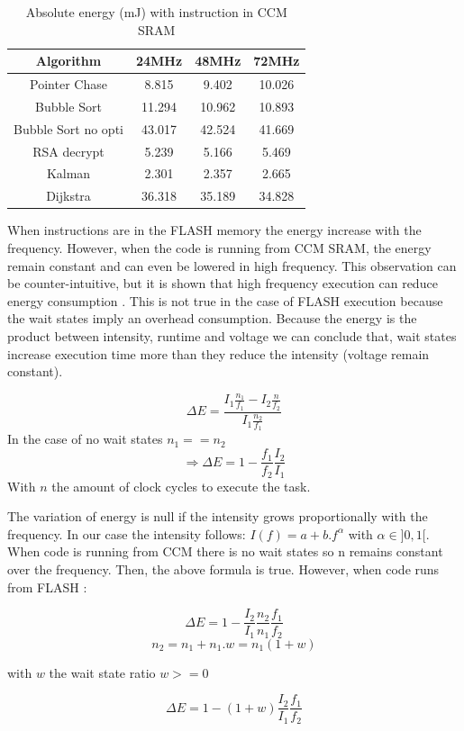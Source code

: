 \documentclass[conference]{IEEEtran}
\begin{document}
\begin{table}[h!]
\centering
\begin{tabular}{||c c c c||} 
 \hline
 Algorithm & 24MHz & 48MHz & 72MHz \\ [0.5ex] \hline\hline
 Pointer Chase & 8.815 & 9.402 & 10.026 \\ 
 Bubble Sort & 11.294 & 10.962 & 10.893 \\
 Bubble Sort no opti & 43.017 & 42.524 & 41.669 \\
 RSA decrypt & 5.239 & 5.166 & 5.469 \\
 Kalman & 2.301 & 2.357 & 2.665 \\
 Dijkstra & 36.318 & 35.189 & 34.828 \\[1ex] 
 \hline
\end{tabular}
\caption{Absolute energy (mJ) with instruction in CCM SRAM}
\label{energy_tab_code_ccm}
\end{table}

When instructions are in the FLASH memory the energy increase with the
frequency. However, when the code is running from CCM SRAM, the energy remain
constant and can even be lowered in high frequency. This observation can be
counter-intuitive, but it is shown that high frequency execution can reduce
energy consumption \cite{pwr_clock}. This is not true in the case of FLASH
execution because the wait states imply an overhead consumption. Because the
energy is the product between intensity, runtime and voltage we can conclude
that, wait states increase execution time more than they reduce the intensity
(voltage remain constant). 

\[\Delta E = \frac{I_1 \frac{n_1}{f_1} - I_2 \frac{n}{f_2}}{I_1 \frac{n_2}{f_1}} \]
In the case of no wait states $n_1 == n_2$
\[\Rightarrow \Delta E = 1 - \frac{f_1}{f_2} \frac{I_2}{I_1}\]
With $n$ the amount of clock cycles to execute the task.

The variation of energy is null if the intensity grows proportionally with the
frequency. In our case the intensity follows: $I(f) = a + b.f^\alpha$ with
$\alpha \in ]0,1[$. When code is running from CCM there is no wait states so n
remains constant over the frequency. Then, the above formula is true. However,
when code runs from FLASH :

\[\Delta E = 1 - \frac{I_2}{I_1} \frac{n_2}{n_1} \frac{f_1}{f_2}\]
\[n_2 = n_1 + n_1.w = n_1(1+w) \] 
\begin{center}
    with $w$ the wait state ratio $w >= 0$   
\end{center}
\[\Delta E = 1 - (1+w)\frac{I_2}{I_1} \frac{f_1}{f_2}\]
\end{document}
